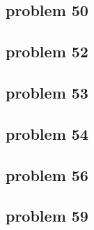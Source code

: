 \subsection{problem 50}


\subsection{problem 52}


\subsection{problem 53}


\subsection{problem 54}


\subsection{problem 56}


\subsection{problem 59}
